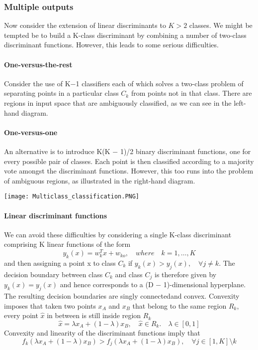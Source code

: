 \documentclass[main.tex]{subfiles}
\begin{document}
\subsubsection{Multiple outputs}
Now consider the extension of linear discriminants to $K>2$ classes. We might be tempted be to build a K-class discriminant by combining a number of two-class discriminant functions. However, this leads to some serious difficulties.
\paragraph{One-versus-the-rest}
Consider the use of K−1 classifiers each of which solves a two-class problem of separating points in a particular class $C_k$ from points not in that class. There are regions in input space that are ambiguously classified, as we can see in the left-hand diagram.
\paragraph{One-versus-one}
An alternative is to introduce K(K − 1)/2 binary discriminant functions, one for every possible pair of classes. Each
point is then classified according to a majority vote amongst the discriminant functions. However, this too runs into the problem of ambiguous regions, as illustrated in the right-hand diagram.
\begin{center}
    \texttt{[image: Multiclass\_classification.PNG]}
\end{center}

\newpage
\paragraph{Linear discriminant functions}
We can avoid these difficulties by considering a single K-class discriminant comprising K linear functions of the form
\begin{equation}
    y_k(x) = w_k^Tx + w_{ko},\quad where \quad k=1,\dots,K
\end{equation}
and then assigning a point x to class $C_k$ if $y_k(x) > y_j (x), \quad \forall j \neq k$. The decision boundary between class $C_k$ and class $C_j$ is therefore given by $y_k(x) = y_j(x)$ and hence corresponds to a (D − 1)-dimensional hyperplane.
The resulting decision boundaries are singly connected\footnotemark and convex. Convexity imposes that taken two points $x_A$ and $x_B$ that belong to the same region $R_k$, every point $\hat{x}$ in between is still inside region $R_k$
\begin{equation*}
    \hat{x} = \lambda x_A + (1-\lambda)x_B, \quad \hat{x}\in R_k. \quad \lambda \in [0, 1]
\end{equation*}
Convexity and linearity of the discriminant functions imply that
\begin{equation*}
    f_k(\lambda x_A + (1-\lambda)x_B) > f_j(\lambda x_A + (1-\lambda)x_B), \quad \forall j \in [1, K] \setminus k
\end{equation*}
\end{document}
